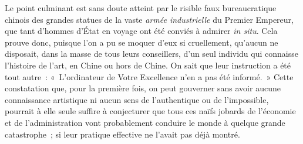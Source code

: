 \documentclass[french,twoside]{book} %
\def\mednobreak{\ifdim\lastskip<\medskipamount
  \removelastskip\nopagebreak\medskip\fi}
\newcommand{\labelblock}[1]{\medbreak{\noindent\color{rubric}\bfseries #1}\par\mednobreak}
\begin{document}
Le point culminant est sans doute atteint par le risible faux bureaucratique chinois des grandes statues de la vaste \emph{armée industrielle} du Premier Empereur, que tant d’hommes d’État en voyage ont été conviés à admirer \emph{in situ}. Cela prouve donc, puisque l’on a pu se moquer d’eux si cruellement, qu’aucun ne disposait, dans la masse de tous leurs conseillers, d’un seul individu qui connaisse l’histoire de l’art, en Chine ou hors de Chine. On sait que leur instruction a été tout autre : « L’ordinateur de Votre Excellence n’en a pas été informé. » Cette constatation que, pour la première fois, on peut gouverner sans avoir aucune connaissance artistique ni aucun sens de l’authentique ou de l’impossible, pourrait à elle seule suffire à conjecturer que tous ces naïfs jobards de l’économie et de l’administration vont probablement conduire le monde à quelque grande catastrophe ; si leur pratique effective ne l’avait pas déjà montré.\par

\labelblock{XVIII}
\end{document}
